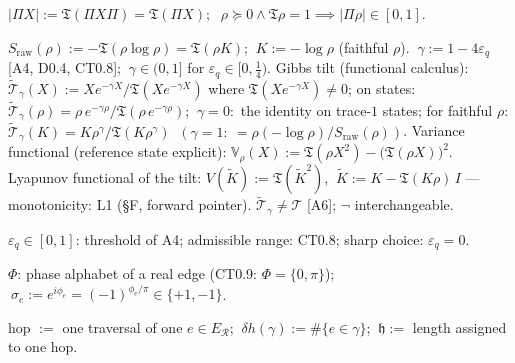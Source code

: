 \begin{definition}[{\texorpdfstring{D0.2}{D0.2}}]\label{tag:D0-2}
$\bigl|\Pi X\bigr|:=\mathfrak T(\Pi X\Pi)=\mathfrak T(\Pi X)$; $\ \ \rho\succeq0\wedge\mathfrak T\rho=1\implies\bigl|\Pi\rho\bigr|\in[0,1]$.

\end{definition}

\begin{definition}[{\texorpdfstring{D0.3}{D0.3}}]\label{tag:D0-3}
$S_{\mathrm{raw}}(\rho):=-\mathfrak T(\rho\log\rho)=\mathfrak T(\rho K)$; $\ K:=-\log\rho$ (faithful $\rho$). $\ \gamma:=1-4\varepsilon_q$ [A4, D0.4, CT0.8]; $\ \gamma\in(0,1]$ for $\varepsilon_q\in[0,\tfrac14)$. Gibbs tilt (functional calculus): $\tilde{\mathcal T}_\gamma(X):=Xe^{-\gamma X}/\mathfrak T(Xe^{-\gamma X})$ where $\mathfrak T(Xe^{-\gamma X})\ne0$; on states: $\tilde{\mathcal T}_\gamma(\rho)=\rho\,e^{-\gamma\rho}/\mathfrak T(\rho\,e^{-\gamma\rho})$; $\ \gamma=0:$ the identity on trace-$1$ states; for faithful $\rho$: $\tilde{\mathcal T}_\gamma(K)=K\rho^{\gamma}/\mathfrak T(K\rho^{\gamma})$ $\ (\gamma=1:\ =\rho(-\log\rho)/S_{\mathrm{raw}}(\rho))$. Variance functional (reference state explicit): $\mathbb V_\rho(X):=\mathfrak T(\rho X^2)-\bigl(\mathfrak T(\rho X)\bigr)^2$. Lyapunov functional of the tilt: $V(\tilde K):=\mathfrak T(\tilde K^2)$, $\ \tilde K:=K-\mathfrak T(K\rho)\,I$ — monotonicity: L1 (§F, forward pointer). $\tilde{\mathcal T}_\gamma\ne\mathcal T$ [A6]; $\neg$ interchangeable.

\end{definition}

\begin{definition}[{\texorpdfstring{D0.4}{D0.4}}]\label{tag:D0-4}
$\varepsilon_q\in[0,1]$: threshold of A4; admissible range: CT0.8; sharp choice: $\varepsilon_q=0$.

\end{definition}

\begin{definition}[{\texorpdfstring{D0.5}{D0.5}}]\label{tag:D0-5}
$\Phi$: phase alphabet of a real edge (CT0.9: $\Phi=\{0,\pi\}$); $\ \sigma_e:=e^{i\phi_e}=(-1)^{\phi_e/\pi}\in\{+1,-1\}$.

\end{definition}

\begin{definition}[{\texorpdfstring{D0.6}{D0.6}}]\label{tag:D0-6}
hop $:=$ one traversal of one $e\in E_{\mathcal R}$; $\ \delta h(\gamma):=\#\{e\in\gamma\}$; $\ \mathfrak h:=$ length assigned to one hop.

\end{definition}

